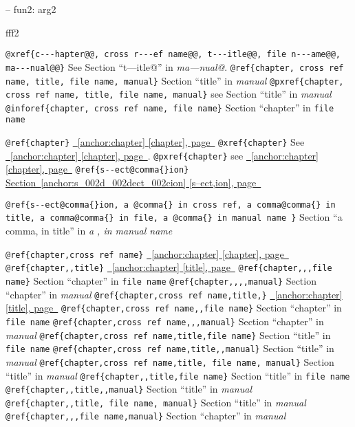 \documentclass{book}
\begin{document}
\hbox{}-- fun2: arg2


%
fff2


\texttt{@xref\{c{-}{-}{-}hapter@@, cross r{-}{-}{-}ef name@@, t{-}{-}{-}itle@@, file n{-}{-}{-}ame@@, ma{-}{-}{-}nual@@\}} See Section ``t---itle@'' in \textit{ma---nual@}.
\texttt{@ref\{chapter, cross ref name, title, file name, manual\}} Section ``title'' in \textit{manual}
\texttt{@pxref\{chapter, cross ref name, title, file name, manual\}} see Section ``title'' in \textit{manual}
\texttt{@inforef\{chapter, cross ref name, file name\}} Section ``chapter'' in \texttt{file name}

\texttt{@ref\{chapter\}} \hyperref[anchor:chapter]{\chaptername~\ref*{anchor:chapter} [chapter], page~\pageref*{anchor:chapter}}
\texttt{@xref\{chapter\}} See \hyperref[anchor:chapter]{\chaptername~\ref*{anchor:chapter} [chapter], page~\pageref*{anchor:chapter}}.
\texttt{@pxref\{chapter\}} see \hyperref[anchor:chapter]{\chaptername~\ref*{anchor:chapter} [chapter], page~\pageref*{anchor:chapter}}
\texttt{@ref\{s{-}{-}ect@comma\{\}ion\}} \hyperref[anchor:s_002d_002dect_002cion]{Section~\ref*{anchor:s_002d_002dect_002cion} [s--ect,ion], page~\pageref*{anchor:s_002d_002dect_002cion}}

\texttt{@ref\{s{-}{-}ect@comma\{\}ion, a @comma\{\} in cross
ref, a comma@comma\{\} in title, a comma@comma\{\} in file, a @comma\{\} in manual name \}}
Section ``a comma, in title'' in \textit{a , in manual name}

\texttt{@ref\{chapter,cross ref name\}} \hyperref[anchor:chapter]{\chaptername~\ref*{anchor:chapter} [chapter], page~\pageref*{anchor:chapter}}
\texttt{@ref\{chapter,,title\}} \hyperref[anchor:chapter]{\chaptername~\ref*{anchor:chapter} [title], page~\pageref*{anchor:chapter}}
\texttt{@ref\{chapter,,,file name\}} Section ``chapter'' in \texttt{file name}
\texttt{@ref\{chapter,,,,manual\}} Section ``chapter'' in \textit{manual}
\texttt{@ref\{chapter,cross ref name,title,\}} \hyperref[anchor:chapter]{\chaptername~\ref*{anchor:chapter} [title], page~\pageref*{anchor:chapter}}
\texttt{@ref\{chapter,cross ref name,,file name\}} Section ``chapter'' in \texttt{file name}
\texttt{@ref\{chapter,cross ref name,,,manual\}} Section ``chapter'' in \textit{manual}
\texttt{@ref\{chapter,cross ref name,title,file name\}} Section ``title'' in \texttt{file name}
\texttt{@ref\{chapter,cross ref name,title,,manual\}} Section ``title'' in \textit{manual}
\texttt{@ref\{chapter,cross ref name,title, file name, manual\}} Section ``title'' in \textit{manual}
\texttt{@ref\{chapter,,title,file name\}} Section ``title'' in \texttt{file name}
\texttt{@ref\{chapter,,title,,manual\}} Section ``title'' in \textit{manual}
\texttt{@ref\{chapter,,title, file name, manual\}} Section ``title'' in \textit{manual}
\texttt{@ref\{chapter,,,file name,manual\}} Section ``chapter'' in \textit{manual}
\end{document}
